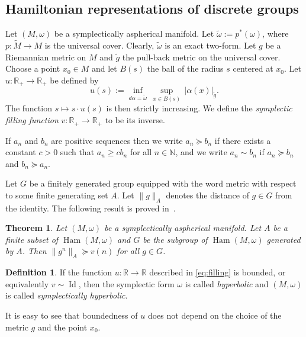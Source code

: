 \documentclass[12pt]{amsart}
\newcommand{\B}[1]{{\mathbb #1}}
\newcommand\R{\B R}
\newtheorem{theorem}[subsection]{Theorem}%
\numberwithin{equation}{section}
\theoremstyle{definition}
\newtheorem{definition}[subsection]{Definition}
\theoremstyle{remark}
\numberwithin{figure}{section}
\numberwithin{table}{section}
\newcommand{\al}{{\alpha}}
\newcommand{\om}{{\omega}}
\newcommand{\Mo}{(M,\omega )}
\newcommand\Ham{\operatorname{Ham}}
\newcommand\id{\operatorname{Id}}
\begin{document}
 
 
 
 
\subsection{Hamiltonian representations of discrete groups} 
\label{SS:polterovich} 
 
Let $\Mo$ be a symplectically aspherical manifold. 
Let $\widetilde \om := p^*(\om)$, where $p:\widetilde M\to M$ 
is the universal cover. Clearly, $\widetilde \om$ is an exact 
two-form. Let $g$ be a Riemannian metric on $M$ and 
$\widetilde g$ the pull-back metric on the universal cover. Choose a point 
$x_0\in M$ and let $B(s)$ the ball of the radius $s$ centered at $x_0$. Let 
$u:\B R_+\to \B R_+$ be defined by 
% 
\begin{equation}\label{eq:filling} 
u(s):=\inf_{d\al=\widetilde\om}\,\sup_{x\in B(s)}\,  
|\al(x)|_{\widetilde g}. 
\end{equation} 
% 
The function $s\mapsto s\cdot u(s)$ is then strictly increasing. We 
define the {\em symplectic filling function} 
$v:\B R_+\to \B R_+$ to be its inverse. 
 
If $a_n$ and $b_n$ are positive sequences then we write 
$a_n\succeq b_n$ if there exists a constant $c>0$ such that 
$a_n\geq cb_n$ for all $n\in \B N$, and we write $a_n\sim b_n$ if 
$a_n\succeq b_n$ and $b_n\succeq a_n$. 
 
Let $G$ be a finitely generated group equipped with the word metric 
with respect to some finite generating set $A$. Let 
$\|g\|_A$ denotes the distance of $g\in G$ from the identity. 
The following result is proved in~\cite[Theorem 1.6.A]{Po}. 
 
\begin{theorem}\label{T:polt} 
Let $\Mo$ be a symplectically aspherical manifold. 
Let $A$ be a finite subset of $\Ham\Mo$ and $G$ be the subgroup of $\Ham\Mo$ 
generated by $A$. 
Then $\|g^n\|_A\succeq v(n)$ for all $g\in G$. 
\end{theorem} 
 
\begin{definition}\label{D:hyp} 
If the function $u: \R \to \R$ described in \eqref{eq:filling} is bounded, or 
equivalently $v\sim \id$,  
then the symplectic form $\omega$ is called {\em hyperbolic} and $\Mo$ is called 
{\em symplectically hyperbolic}. 
\end{definition} 
 
It is easy to see that boundedness of $u$ does not depend on the choice of the 
metric $g$ and the point $x_0$. 
 
\end{document}
